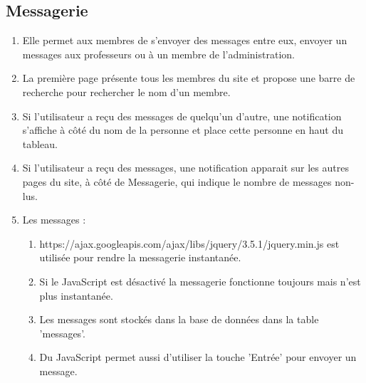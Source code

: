 \documentclass[12pt,a4paper]{article}
\begin{document}
\subsection{Messagerie}
\begin{enumerate}
    \item Elle permet aux membres de s'envoyer des messages entre eux, envoyer un messages aux professeurs ou à un membre de l'administration.
    \item La première page présente tous les membres du site et propose une barre de recherche pour rechercher le nom d'un membre.
    \item Si l'utilisateur a reçu des messages de quelqu'un d'autre, une notification s'affiche à côté du nom de la personne et place cette personne en haut du tableau.
    \item Si l'utilisateur a reçu des messages, une notification apparait sur les autres pages du site, à côté de Messagerie, qui indique le nombre de messages non-lus.
    \item Les messages :
    \begin{enumerate}
        \item https://ajax.googleapis.com/ajax/libs/jquery/3.5.1/jquery.min.js est utilisée pour rendre la messagerie instantanée.
        \item Si le JavaScript est désactivé la messagerie fonctionne toujours mais n'est plus instantanée.
        \item Les messages sont stockés dans la base de données dans la table 'messages'.
        \item Du JavaScript permet aussi d'utiliser la touche 'Entrée' pour envoyer un message.
    \end{enumerate}
\end{enumerate}
\end{document}
